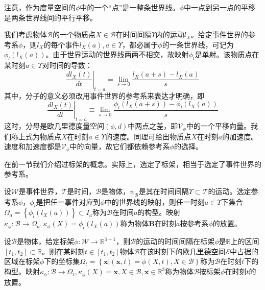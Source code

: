 \documentclass[main.tex]{subfiles}
\begin{document}
注意，作为度量空间的$\phi$中的一个“点”是一整条世界线。$\phi$中一点到另一点的平移是两条世界线间的平行平移。

我们考虑物体$\mathcal{B}$的一个物质点$X\in\mathcal{B}$在时间间隔$\Upsilon$内的运动$l_X$。给定事件世界的参考系$\phi$，则$l_X$的每个事件$l_X\left(a\right),a\in\Upsilon$，都必属于$\phi$的一条世界线，可记为$\phi_l\left(l_X\left(a\right)\right)$。由于世界运动的世界线两两不相交，故映射$\phi_l$是单射。该物质点在某时刻$a\in\Upsilon$对时间的导数：
\[
\left.\frac{d l_X\left(t\right)}{dt}\right|_{t=a}=\lim_{s\to 0}\frac{l_X\left(a+s\right)-l_X\left(a\right)}{s}
\]
其中，分子的意义必须改用事件世界的参考系来表达才明确，即
\[\left.\frac{d l_X\left(t\right)}{dt}\right|_{t=a}\equiv\lim_{s\to 0}\frac{\phi_l\left(l_X\left(a+s\right)\right)-\phi_l\left(l_X\left(a\right)\right)}{s}
\]
这时，分母是欧几里德度量空间$\left(\phi,d\right)$中两点之差，即$\mathcal{V}_\phi$中的一个平移向量。我们称上式为物质点$X$在时刻$a\in\Upsilon$的速度。同理可给出物质点$X$在时刻$a$的加速度。速度和加速度都是$\mathcal{V}_\phi$中的向量，故它们都依赖参考系$\phi$的选择。

在前一节我们介绍过标架的概念。实际上，选定了标架，相当于选定了事件世界的参考系。

\begin{definition}[构型]
设$\mathcal{W}$是事件世界，$\mathcal{T}$是时间，$\mathcal{B}$是物体，$\psi_\mathcal{B}$是其在时间间隔$\Upsilon\subset\mathcal{T}$的运动。选定参考系$\phi$，$\phi_l$是把任一事件对应到$\phi$中的世界线的映射，则任一时刻$a\in\Upsilon$下集合$\Omega_a=\left\{\phi_l\left(l_X\left(a\right)\right)\right\}\subset I_a$称为$\mathcal{B}$在时间$a$的构型。映射$\kappa_\phi:\mathcal{B}\rightarrow\Omega_a,\kappa_\phi\left(X\right)=\phi_l\left(l_X\left(a\right)\right)$称为物体$\mathbf{B}$在时刻$a$按参考系$\phi$的放置。
\end{definition}

\begin{definition}[构型（简化）]
设$\mathcal{B}$是物体，给定标架$\phi:\mathcal{W}\rightarrow\mathbb{R}^{3+1}$，则$\mathcal{B}$的运动的时间间隔在标架$\phi$是$\mathbb{R}$上的区间$\left[t_1,t_2\right]\subset\mathbb{R}$。则在某时刻$t\in\left[t_1,t_2\right]$物体$\mathcal{B}$在该时刻下的欧几里德空间$\mathcal{E}$中占据的区域在标架$\phi$下的坐标集$\Omega_t=\left\{\mathbf{x}|\left(\mathbf{x},t\right)=\phi\left(X,t\right),X\in\mathcal{B}\right\}$称为$\mathcal{B}$在时刻$t$下的构型。映射$\kappa_\phi:\mathcal{B}\rightarrow\Omega_t,\kappa_\phi\left(X\right)=\mathbf{x},X\in\mathcal{B},\mathbf{x}\in\mathbb{R}^3$称为物体$\mathcal{B}$按标架$\phi$在时刻$t$的放置。
\end{definition}
\end{document}
